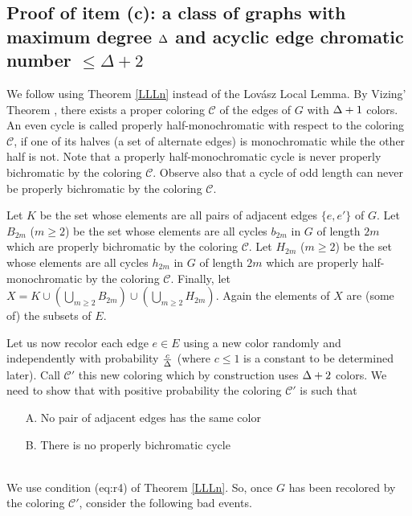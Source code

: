 \documentclass[11pt]{article}
\begin{document}
\subsection{Proof of  item (c): a class of graphs with maximum degree $\Delta$ and acyclic edge chromatic number $\le \Delta +2$}
 We follow  \cite{ASZ} using Theorem \ref{LLLn} instead of the Lov\'asz Local Lemma.
By Vizing' Theorem \cite{V}, there exists a proper coloring $\mathcal C$  of the edges of $G$ with $\Delta+1$
colors. An even cycle is called properly half-monochromatic with respect to the coloring $\mathcal C$,  if  one of its halves (a set of alternate edges)
is monochromatic while the other half is not. Note that a  properly  half-monochromatic cycle is never properly  bichromatic by the coloring $\mathcal C$. Observe also that a cycle
of odd length can  never  be properly bichromatic  by the coloring $\mathcal C$.





Let   $K$ be the set whose elements are all pairs   of adjacent edges  $\{e,e'\}$ of $G$.
Let $B_{2m}$ ($m\ge 2$)  be the set whose elements  are  all cycles $b_{2m}$ in $G$ of length $2m$ which are properly bichromatic by the coloring $\mathcal C$.
Let $H_{2m}$ ($m\ge 2$)  be the set whose elements  are  all cycles $h_{2m}$ in $G$ of length $2m$ which are properly half-monochromatic by the coloring $\mathcal C$.
Finally, let $X= K\cup(\bigcup_{m\ge 2}B_{2m})\cup (\bigcup_{m\ge 2}H_{2m})$.
Again the elements of $X$ are (some of) the subsets of $E$.





Let us now recolor each edge $e\in E$ using a new color randomly and independently with probability
${c\over \Delta}$ (where $c\le 1$ is a constant to be determined later). Call $\mathcal C'$ this new coloring which by construction uses $\Delta+2$ colors.
We need to  show  that with positive probability the coloring  $\mathcal C'$ is such that

\begin{itemize}
\item[A.] No pair of adjacent edges has the same color

\item[B.] There is no properly bichromatic cycle
 \end{itemize}

\\We use condition \equ(eq:r4) of Theorem  \ref{LLLn}. So, once $G$ has been recolored by the coloring $\mathcal C'$, consider the following bad events.
\end{document}
